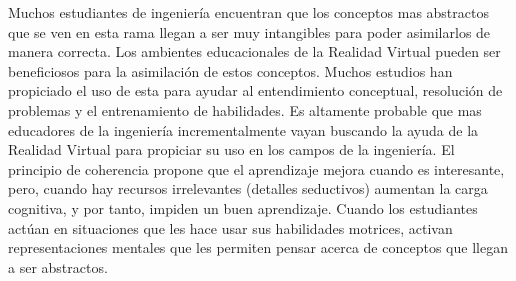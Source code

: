 Muchos estudiantes de ingeniería encuentran que los conceptos mas abstractos que se ven en esta rama llegan a ser muy intangibles para poder asimilarlos de manera correcta. Los ambientes educacionales de la Realidad Virtual pueden ser beneficiosos para la asimilación de estos conceptos. Muchos estudios han propiciado el uso de esta para ayudar al entendimiento conceptual, resolución de problemas y el entrenamiento de habilidades. Es altamente probable que mas educadores de la ingeniería incrementalmente vayan buscando la ayuda de la Realidad Virtual para propiciar su uso en los campos de la ingeniería. El principio de coherencia propone que el aprendizaje mejora cuando es interesante, pero, cuando hay recursos irrelevantes (detalles seductivos) aumentan la carga cognitiva, y por tanto, impiden un buen aprendizaje. Cuando los estudiantes actúan  en situaciones que les hace usar sus habilidades motrices, activan representaciones mentales que les permiten pensar acerca de conceptos que llegan a ser abstractos.\parencite{OJE2023100033}
